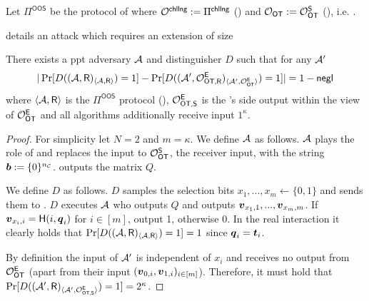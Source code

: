 \begin{definition}\label{def:OOS}
	Let $\Pi^{\textsf{OOS}}$ be the protocol of  where $\mathcal{O}^{\textsf{chllng}}:=\Pi^{\textsf{chllng}}$ () and $\mathcal{O}_{\mathsf{OT}}:=\mathcal{O}_{\mathsf{OT}}^\mathsf{S}$ (), i.e.  \cite[Protocol 2]{RSA:OrrOrsSch17}.
\end{definition}





 details an attack which requires an extension of size

\begin{lemma} \label{lem:malSend}
	There exists a ppt adversary $\mathcal{A}$ and distinguisher $D$ such that for any $\mathcal{A}'$ 
	$$
		|\Pr[D((\mathcal{A}, \mathsf{R})_{\langle\mathcal{A},\mathsf{R}\rangle})=1]-\Pr[D((\mathcal{A}', \mathcal{O}^{\mathsf{E}}_{\textsf{OT,\ensuremath{\mathsf{R}}}})_{\langle\mathcal{A}',\mathcal{O}^{\mathsf{E}}_{\textsf{OT}}\rangle})=1]|=1-\mathsf{negl}
	$$
	where $\langle\mathcal{A},\mathsf{R}\rangle$ is the $\Pi^{\textsf{OOS}}$ protocol (), $\mathcal{O}^{\mathsf{E}}_{\textsf{OT,\ensuremath{\mathsf{S}}}}$ is the \send's side output within the view of $\mathcal{O}_{\mathsf{OT}}^{\mathsf{E}}$ and all algorithms additionally receive input $1^\kappa$. 
\end{lemma}
\begin{proof} 
	For simplicity let $N=2$ and $m=\kappa$. We define $\mathcal{A}$ as follows. $\mathcal{A}$ plays the role of \send and replaces the input to $\mathcal{O}_{\mathsf{OT}}^\mathsf{S}$, the receiver input, with the string $\boldsymbol{b}:=\{0\}^{{n_\mathcal{C}}}$. \Adv outputs the matrix $Q$.
	
	We define $D$ as follows. $D$ samples the selection bits $x_1,...,x_m\gets\{0,1\}$ and sends them to \rec. $D$ executes $\mathcal{A}$ who outputs $Q$ and \rec outputs $\boldsymbol{v}_{x_1,1},...,\boldsymbol{v}_{x_m,m}$. If $\boldsymbol{v}_{x_i,i}=\mathsf{H}(i,\boldsymbol{q}_i)$ for $i\in[m]$, output 1, otherwise 0. In the real interaction it clearly holds that $\Pr[D((\mathcal{A}, \mathsf{R})_{\langle\mathcal{A},\mathsf{R}\rangle})=1]=1$ since $\boldsymbol{q}_i=\boldsymbol{t}_i$.
	
	By definition the input of $\mathcal{A}'$ is independent of $x_i$ and receives no output from $\mathcal{O}_{\mathsf{OT}}^\mathsf{E}$ (apart from their input $(\boldsymbol{v}_{0,i},\boldsymbol{v}_{1,i})_{i\in [m]}$). Therefore, it must hold that $\Pr[D((\mathcal{A}', \mathsf{R})_{\langle\mathcal{A}',\mathcal{O}^{\mathsf{E}}_{\textsf{OT,\ensuremath{\mathsf{S}}}}\rangle})=1]=2^{\kappa}$.
\end{proof}


